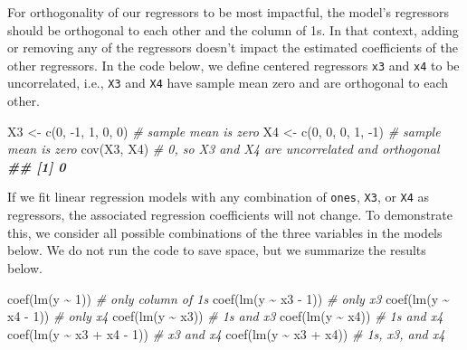 \documentclass[
]{book}
\newenvironment{Shaded}{\begin{snugshade}}{\end{snugshade}}
\newcommand{\CommentTok}[1]{\textcolor[rgb]{0.56,0.35,0.01}{\textit{#1}}}
\newcommand{\DecValTok}[1]{\textcolor[rgb]{0.00,0.00,0.81}{#1}}
\newcommand{\DocumentationTok}[1]{\textcolor[rgb]{0.56,0.35,0.01}{\textbf{\textit{#1}}}}
\newcommand{\FunctionTok}[1]{\textcolor[rgb]{0.00,0.00,0.00}{#1}}
\newcommand{\NormalTok}[1]{#1}
\newcommand{\OtherTok}[1]{\textcolor[rgb]{0.56,0.35,0.01}{#1}}
\newcommand{\SpecialCharTok}[1]{\textcolor[rgb]{0.00,0.00,0.00}{#1}}
\theoremstyle{definition}
\theoremstyle{definition}
\theoremstyle{definition}
\theoremstyle{definition}
\theoremstyle{remark}
\begin{document}
For orthogonality of our regressors to be most impactful, the model's
regressors should be orthogonal to each other and the column of 1s. In
that context, adding or removing any of the regressors doesn't impact
the estimated coefficients of the other regressors. In the code below,
we define centered regressors \texttt{x3} and \texttt{x4} to be uncorrelated, i.e.,
\texttt{X3} and \texttt{X4} have sample mean zero and are orthogonal to each other.

\begin{Shaded}
\begin{Highlighting}[]
\NormalTok{X3 }\OtherTok{\textless{}{-}}  \FunctionTok{c}\NormalTok{(}\DecValTok{0}\NormalTok{, }\SpecialCharTok{{-}}\DecValTok{1}\NormalTok{, }\DecValTok{1}\NormalTok{, }\DecValTok{0}\NormalTok{, }\DecValTok{0}\NormalTok{) }\CommentTok{\# sample mean is zero}
\NormalTok{X4 }\OtherTok{\textless{}{-}} \FunctionTok{c}\NormalTok{(}\DecValTok{0}\NormalTok{, }\DecValTok{0}\NormalTok{, }\DecValTok{0}\NormalTok{, }\DecValTok{1}\NormalTok{, }\SpecialCharTok{{-}}\DecValTok{1}\NormalTok{)  }\CommentTok{\# sample mean is zero}
\FunctionTok{cov}\NormalTok{(X3, X4)              }\CommentTok{\# 0, so X3 and X4 are uncorrelated and orthogonal}
\DocumentationTok{\#\# [1] 0}
\end{Highlighting}
\end{Shaded}

If we fit linear regression models with any combination of \texttt{ones}, \texttt{X3},
or \texttt{X4} as regressors, the associated regression coefficients will not
change. To demonstrate this, we consider all possible combinations of
the three variables in the models below. We do not run the code to save
space, but we summarize the results below.

\begin{Shaded}
\begin{Highlighting}[]
\FunctionTok{coef}\NormalTok{(}\FunctionTok{lm}\NormalTok{(y }\SpecialCharTok{\textasciitilde{}} \DecValTok{1}\NormalTok{))           }\CommentTok{\# only column of 1s}
\FunctionTok{coef}\NormalTok{(}\FunctionTok{lm}\NormalTok{(y }\SpecialCharTok{\textasciitilde{}}\NormalTok{ x3 }\SpecialCharTok{{-}} \DecValTok{1}\NormalTok{))      }\CommentTok{\# only x3}
\FunctionTok{coef}\NormalTok{(}\FunctionTok{lm}\NormalTok{(y }\SpecialCharTok{\textasciitilde{}}\NormalTok{ x4 }\SpecialCharTok{{-}} \DecValTok{1}\NormalTok{))      }\CommentTok{\# only x4}
\FunctionTok{coef}\NormalTok{(}\FunctionTok{lm}\NormalTok{(y }\SpecialCharTok{\textasciitilde{}}\NormalTok{ x3))          }\CommentTok{\# 1s and x3}
\FunctionTok{coef}\NormalTok{(}\FunctionTok{lm}\NormalTok{(y }\SpecialCharTok{\textasciitilde{}}\NormalTok{ x4))          }\CommentTok{\# 1s and x4}
\FunctionTok{coef}\NormalTok{(}\FunctionTok{lm}\NormalTok{(y }\SpecialCharTok{\textasciitilde{}}\NormalTok{ x3 }\SpecialCharTok{+}\NormalTok{ x4 }\SpecialCharTok{{-}} \DecValTok{1}\NormalTok{)) }\CommentTok{\# x3 and x4}
\FunctionTok{coef}\NormalTok{(}\FunctionTok{lm}\NormalTok{(y }\SpecialCharTok{\textasciitilde{}}\NormalTok{ x3 }\SpecialCharTok{+}\NormalTok{ x4))     }\CommentTok{\# 1s, x3, and x4}
\end{Highlighting}
\end{Shaded}
\end{document}
